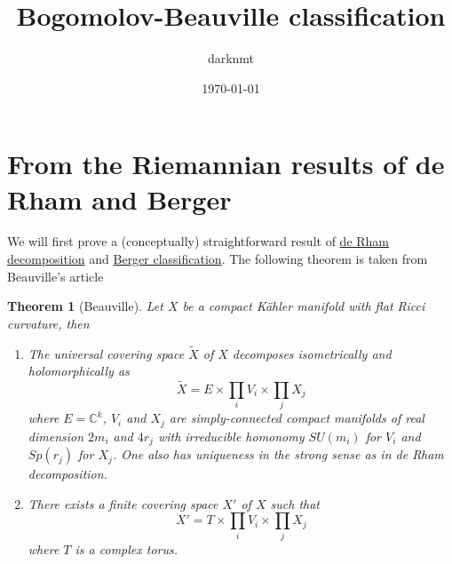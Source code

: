 \documentclass[11pt]{article}
\author{darknmt}
\date{\today}
\title{Bogomolov-Beauville classification}
\newtheorem{theorem}{Theorem}
\begin{document}
\maketitle
\tableofcontents


\section{From the Riemannian results of de Rham and Berger}
\label{sec:org8fd1336}

We will first prove a (conceptually) straightforward result of \href{de-rham-decomposition.org}{de Rham decomposition} and
\href{Berger-remark-complex}{Berger classification}. The following theorem is taken from Beauville's article
\begin{theorem}[Beauville]
\label{thm:beauville-1}
\label{orgdf9aa02}
Let \(X\) be a compact Kähler manifold with flat Ricci curvature, then
\begin{enumerate}
\item The universal covering space \(\tilde X\) of \(X\) decomposes isometrically and holomorphically as
\[\tilde X = E \times\prod_i V_i\times \prod_j X_j\] where \(E = \mathbb{C}^k\), \(V_i\) and \(X_j\)
are simply-connected compact manifolds of real dimension \(2m_i\) and \(4r_j\) with irreducible homonomy
\(SU(m_i)\) for \(V_i\) and \(Sp(r_j)\) for \(X_j\). One also has uniqueness in the strong sense as in de
Rham decomposition.
\item There exists a finite covering space \(X'\) of \(X\) such that \[ X' = T\times \prod_i V_i
   \times \prod_j X_j\] where \(T\) is a complex torus.
\end{enumerate}
\end{theorem}
\end{document}
